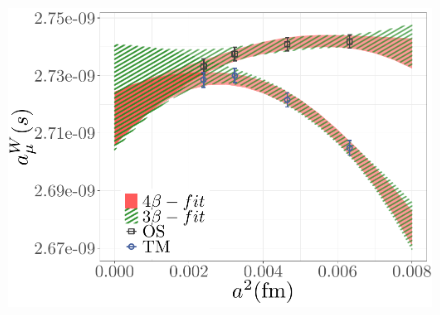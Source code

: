 \documentclass[a4paper,11pt]{article}
\begin{document}
\begin{figure}
  \includegraphics[width=\linewidth]{plots/amu_s_W_a4}
\end{figure}
\end{document}
